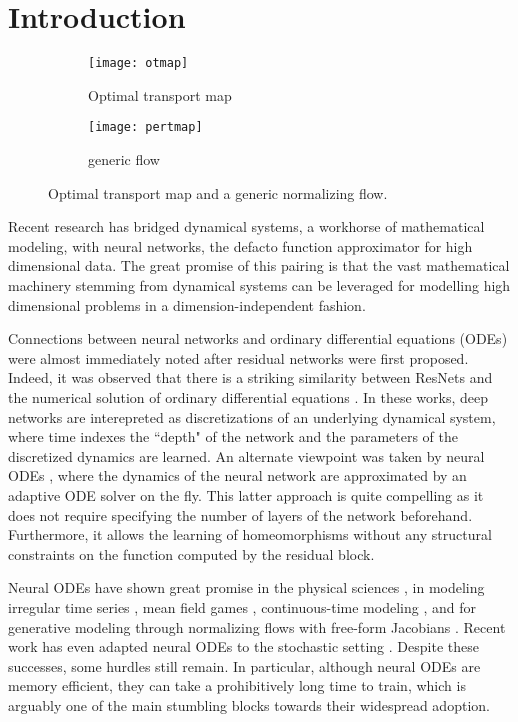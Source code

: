 \documentclass{article}
\theoremstyle{definition}
\theoremstyle{remark}
\begin{document}
\section{Introduction}
\begin{figure}[ht]
  \vskip -0.1in
    \centering
    \begin{subfigure}[t]{.45\columnwidth}
      \texttt{[image: otmap]}
  \caption{Optimal transport map}\label{fig:ot}
  \end{subfigure}
  \hspace{1em}
  \begin{subfigure}[t]{.45\columnwidth}
    \texttt{[image: pertmap]}
  \caption{generic flow}\label{fig:squiggles}
  \end{subfigure}
  \caption{Optimal transport map and a generic normalizing flow.}\label{fig:1}
\vskip -0.1in
\end{figure}
Recent research has bridged dynamical systems,
a workhorse of
mathematical modeling, with neural networks, the defacto function approximator
for high dimensional data. The great promise of this pairing is that the vast
mathematical machinery stemming from dynamical systems can be leveraged for
modelling high dimensional problems in a dimension-independent fashion.

Connections between neural networks and ordinary differential equations (ODEs) were almost
immediately noted after residual networks  \cite{resnet} were first proposed. Indeed, it was observed that there is a striking
similarity between ResNets and the numerical solution of ordinary differential
equations
\citep{e_proposal_2017,haber2017stable,ruthotto2018deep,chen2018neural,behrmann2018invertible}.
In these works, deep networks are interepreted as discretizations of an
underlying dynamical system, where time indexes the ``depth" of the network and the
parameters of the discretized dynamics are learned. An alternate viewpoint was
taken by neural ODEs \citep{chen2018neural}, where the dynamics of the neural
network are approximated by an adaptive ODE solver on the fly. This latter
approach is quite compelling as it does not require specifying the number of layers of the network
beforehand. Furthermore, it allows the
learning of homeomorphisms without any structural constraints on the function computed
by the residual block. 

Neural ODEs have shown great promise in the physical sciences 
\citep{kohler2019equivariant}, in modeling irregular time series
\citep{rubanova2019latent}, mean field games \cite{ruthotto19}, continuous-time
modeling \cite{YildizHL19,kanaasimple}, and for generative modeling through normalizing flows with free-form Jacobians \citep{grathwohl_ffjord}.
Recent work has even adapted neural ODEs to the stochastic setting
\cite{li2020sde}.
Despite these successes, some hurdles still remain. 
In particular, although neural ODEs are memory efficient, they can take a
prohibitively long time to train, which is arguably one of the main stumbling
blocks towards their widespread adoption.
\end{document}
